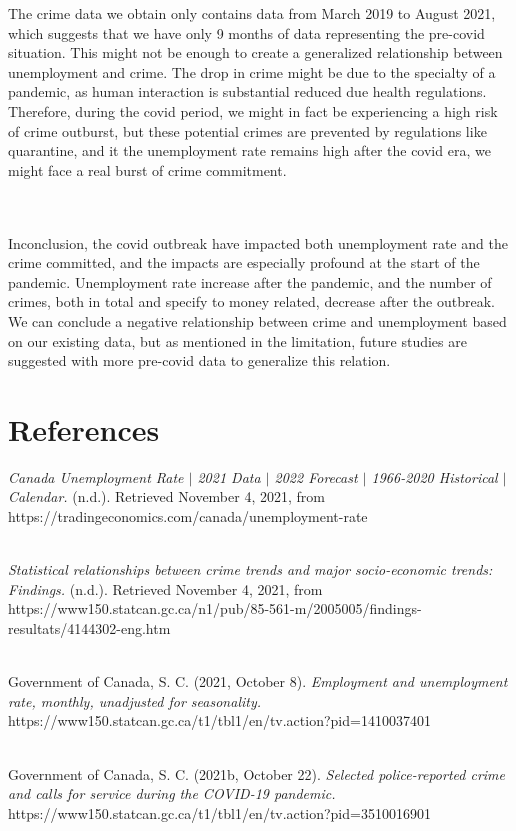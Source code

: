 \documentclass[fontsize=11pt]{article}
\begin{document}
The crime data we obtain only contains data from March 2019 to August 2021, which suggests that we have only 9 months of data representing the pre-covid situation. This might not be enough to create a generalized relationship between unemployment and crime.  The drop in crime might be due to the specialty of a pandemic, as human interaction is substantial reduced due health regulations.  Therefore, during the covid period, we might in fact be experiencing a high risk of crime outburst, but these potential crimes are prevented by regulations like quarantine, and it the unemployment rate remains high after the covid era, we might face a real burst of crime commitment.


\\ \hspace*{\fill} \\
Inconclusion, the covid outbreak have impacted both unemployment rate and the crime committed, and the impacts are especially  profound at the start of the pandemic. Unemployment rate increase after the pandemic, and the number of crimes, both in total and specify to money related, decrease after the outbreak. We can conclude a negative relationship between crime and unemployment based on our existing data, but as mentioned in the limitation, future studies are suggested with more pre-covid data to generalize this relation.

\section*{References}

\emph{Canada Unemployment Rate $|$ 2021 Data $|$ 2022 Forecast $|$ 1966-2020 Historical $|$ Calendar. } (n.d.). Retrieved November 4, 2021, from https://tradingeconomics.com/canada/unemployment-rate

\hspace*{\fill}\\
\emph{Statistical relationships between crime trends and major socio-economic trends: Findings.} (n.d.). Retrieved November 4, 2021, from https://www150.statcan.gc.ca/n1/pub/85-561-m/2005005/findings-resultats/4144302-eng.htm

\hspace*{\fill}\\
Government of Canada, S. C. (2021, October 8). \emph{Employment and unemployment rate, monthly, unadjusted for seasonality.} https://www150.statcan.gc.ca/t1/tbl1/en/tv.action?pid=1410037401

\hspace*{\fill}\\
Government of Canada, S. C. (2021b, October 22). \emph{Selected police-reported crime and calls for service during the COVID-19 pandemic.} https://www150.statcan.gc.ca/t1/tbl1/en/tv.action?pid=3510016901

\end{document}

